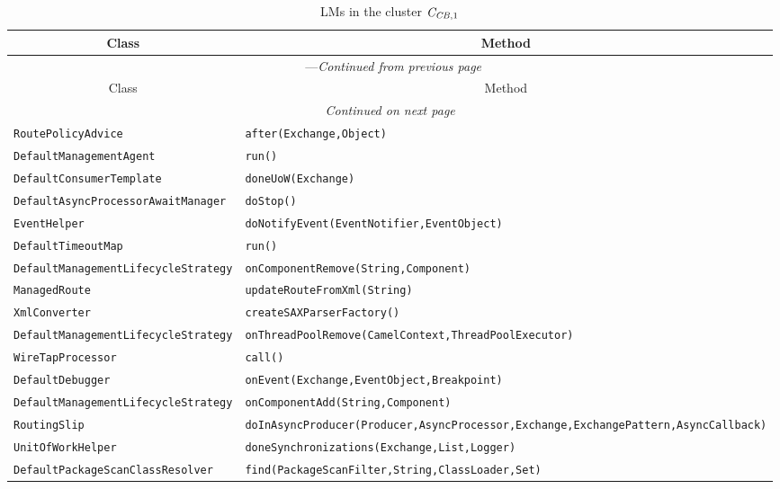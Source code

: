 \begin{center}
\begin{longtable}{ll}
\caption{LMs in the cluster $\mathit{C}_{\mathit{CB},1}$}\\
\toprule\multicolumn{1}{c}{Class}&\multicolumn{1}{c}{Method}\\\midrule
\endfirsthead

\multicolumn{2}{c}{\tablename\ \thetable{}---\textit{Continued from previous page}} \\\midrule
\multicolumn{1}{c}{Class}&\multicolumn{1}{c}{Method}\\\midrule
\endhead
\multicolumn{2}{c}{\textit{Continued on next page}}\\\midrule
\endfoot
\bottomrule
\endlastfoot

\lstinline/RoutePolicyAdvice/&{\lstinline/after(Exchange,Object)/}\\
\lstinline/DefaultManagementAgent/&{\lstinline/run()/}\\
\lstinline/DefaultConsumerTemplate/&{\lstinline/doneUoW(Exchange)/}\\
\lstinline/DefaultAsyncProcessorAwaitManager/&{\lstinline/doStop()/}\\
\lstinline/EventHelper/&{\lstinline/doNotifyEvent(EventNotifier,EventObject)/}\\
\lstinline/DefaultTimeoutMap/&{\lstinline/run()/}\\
\lstinline/DefaultManagementLifecycleStrategy/&{\lstinline/onComponentRemove(String,Component)/}\\
\lstinline/ManagedRoute/&{\lstinline/updateRouteFromXml(String)/}\\
\lstinline/XmlConverter/&{\lstinline/createSAXParserFactory()/}\\
\lstinline/DefaultManagementLifecycleStrategy/&{\lstinline/onThreadPoolRemove(CamelContext,ThreadPoolExecutor)/}\\
\lstinline/WireTapProcessor/&{\lstinline/call()/}\\
\lstinline/DefaultDebugger/&{\lstinline/onEvent(Exchange,EventObject,Breakpoint)/}\\
\lstinline/DefaultManagementLifecycleStrategy/&{\lstinline/onComponentAdd(String,Component)/}\\
\lstinline/RoutingSlip/&{\lstinline/doInAsyncProducer(Producer,AsyncProcessor,Exchange,ExchangePattern,AsyncCallback)/}\\
\lstinline/UnitOfWorkHelper/&{\lstinline/doneSynchronizations(Exchange,List,Logger)/}\\
\lstinline/DefaultPackageScanClassResolver/&{\lstinline/find(PackageScanFilter,String,ClassLoader,Set)/}\\

\end{longtable}
\end{center}

